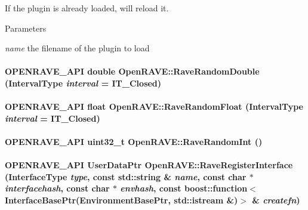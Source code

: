 If the plugin is already loaded, will reload it. 
\begin{DoxyParams}{Parameters}
\item[{\em name}]the filename of the plugin to load \end{DoxyParams}
\hypertarget{namespaceOpenRAVE_aee509dcc75db9b102d2fd497e1f21de6}{
\paragraph[{RaveRandomDouble}]{\setlength{\rightskip}{0pt plus 5cm}OPENRAVE\_\-API double OpenRAVE::RaveRandomDouble (IntervalType {\em interval} = {\ttfamily IT\_\-Closed})}\hfill}
\label{namespaceOpenRAVE_aee509dcc75db9b102d2fd497e1f21de6}
\hypertarget{namespaceOpenRAVE_a6fe8f01c322a5b2e5bccb4928f93ac0f}{
\paragraph[{RaveRandomFloat}]{\setlength{\rightskip}{0pt plus 5cm}OPENRAVE\_\-API float OpenRAVE::RaveRandomFloat (IntervalType {\em interval} = {\ttfamily IT\_\-Closed})}\hfill}
\label{namespaceOpenRAVE_a6fe8f01c322a5b2e5bccb4928f93ac0f}
\hypertarget{namespaceOpenRAVE_abc3b63337e9c8767dc7e18b30747029b}{
\paragraph[{RaveRandomInt}]{\setlength{\rightskip}{0pt plus 5cm}OPENRAVE\_\-API uint32\_\-t OpenRAVE::RaveRandomInt ()}\hfill}
\label{namespaceOpenRAVE_abc3b63337e9c8767dc7e18b30747029b}
\hypertarget{namespaceOpenRAVE_ad1ac80a7afacdb4a3a93086916eaa9e9}{
\paragraph[{RaveRegisterInterface}]{\setlength{\rightskip}{0pt plus 5cm}OPENRAVE\_\-API UserDataPtr OpenRAVE::RaveRegisterInterface (InterfaceType {\em type}, \/  const std::string \& {\em name}, \/  const char $\ast$ {\em interfacehash}, \/  const char $\ast$ {\em envhash}, \/  const boost::function$<$ InterfaceBasePtr(EnvironmentBasePtr, std::istream \&)$>$ \& {\em createfn})}\hfill}
\label{namespaceOpenRAVE_ad1ac80a7afacdb4a3a93086916eaa9e9}


